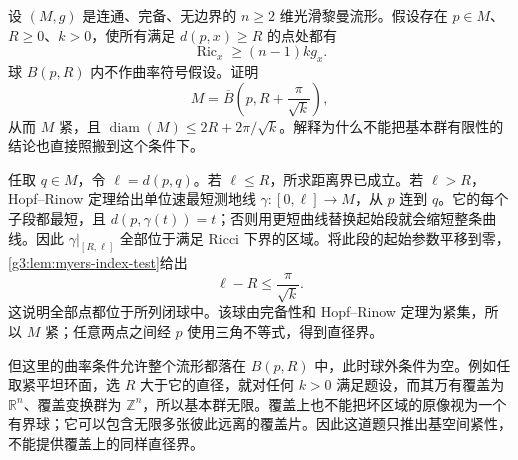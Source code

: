 \begin{exercise}\label{g3:ex:myers-positive-outside-ball}
	设 \((M,g)\) 是连通、完备、无边界的 \(n\ge2\) 维光滑黎曼流形。假设存在 \(p\in M\)、\(R\ge0\)、\(k>0\)，使所有满足 \(d(p,x)\ge R\) 的点处都有
	\[
		\operatorname{Ric}_x\ge(n-1)k g_x.
	\]
	球 \(B(p,R)\) 内不作曲率符号假设。证明
	\[
		M=\overline B\left(p,R+\frac\pi{\sqrt k}\right),
	\]
	从而 \(M\) 紧，且 \(\operatorname{diam}(M)\le2R+2\pi/\sqrt k\)。解释为什么不能把基本群有限性的结论也直接照搬到这个条件下。
\end{exercise}
\begin{solution}
	任取 \(q\in M\)，令 \(\ell=d(p,q)\)。若 \(\ell\le R\)，所求距离界已成立。若 \(\ell>R\)，Hopf--Rinow 定理给出单位速最短测地线 \(\gamma:[0,\ell]\to M\)，从 \(p\) 连到 \(q\)。它的每个子段都最短，且 \(d(p,\gamma(t))=t\)；否则用更短曲线替换起始段就会缩短整条曲线。因此 \(\gamma|_{[R,\ell]}\) 全部位于满足 Ricci 下界的区域。将此段的起始参数平移到零，\cref{g3:lem:myers-index-test}给出
	\[
		\ell-R\le\frac\pi{\sqrt k}.
	\]
	这说明全部点都位于所列闭球中。该球由完备性和 Hopf--Rinow 定理为紧集，所以 \(M\) 紧；任意两点之间经 \(p\) 使用三角不等式，得到直径界。

	但这里的曲率条件允许整个流形都落在 \(B(p,R)\) 中，此时球外条件为空。例如任取紧平坦环面，选 \(R\) 大于它的直径，就对任何 \(k>0\) 满足题设，而其万有覆盖为 \(\mathbb R^n\)、覆盖变换群为 \(\mathbb Z^n\)，所以基本群无限。覆盖上也不能把坏区域的原像视为一个有界球；它可以包含无限多张彼此远离的覆盖片。因此这道题只推出基空间紧性，不能提供覆盖上的同样直径界。
\end{solution}

